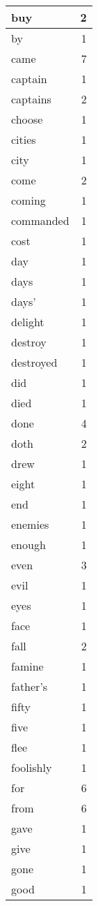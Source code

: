 \begin{center}
\begin{longtable}{l|r}
buy & 2 \\ \hline
by & 1 \\ \hline
came & 7 \\ \hline
captain & 1 \\ \hline
captains & 2 \\ \hline
choose & 1 \\ \hline
cities & 1 \\ \hline
city & 1 \\ \hline
come & 2 \\ \hline
coming & 1 \\ \hline
commanded & 1 \\ \hline
cost & 1 \\ \hline
day & 1 \\ \hline
days & 1 \\ \hline
days' & 1 \\ \hline
delight & 1 \\ \hline
destroy & 1 \\ \hline
destroyed & 1 \\ \hline
did & 1 \\ \hline
died & 1 \\ \hline
done & 4 \\ \hline
doth & 2 \\ \hline
drew & 1 \\ \hline
eight & 1 \\ \hline
end & 1 \\ \hline
enemies & 1 \\ \hline
enough & 1 \\ \hline
even & 3 \\ \hline
evil & 1 \\ \hline
eyes & 1 \\ \hline
face & 1 \\ \hline
fall & 2 \\ \hline
famine & 1 \\ \hline
father's & 1 \\ \hline
fifty & 1 \\ \hline
five & 1 \\ \hline
flee & 1 \\ \hline
foolishly & 1 \\ \hline
for & 6 \\ \hline
from & 6 \\ \hline
gave & 1 \\ \hline
give & 1 \\ \hline
gone & 1 \\ \hline
good & 1 \\ \hline

\end{longtable}
\end{center}
